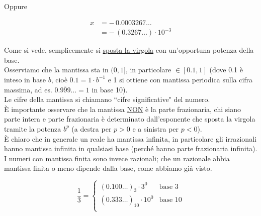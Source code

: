 Oppure
\begin{esempio}
\[\begin{split}
    x & = - \, 0.0003267 \dotsc \\
    & = - \, (0.3267 \dotsc) \cdot 10^{-3} 
\end{split}\]
\end{esempio}
Come si vede, semplicemente si \uline{sposta la virgola} con un'opportuna potenza della base. \\
Osserviamo che la mantissa sta in $(0,1]$, in particolare $\in [0.1, 1]$ (dove 0.1 è inteso in base $b$, cioè $0.1 = 1 \cdot b^{-1}$ e 1 si ottiene con mantissa periodica sulla cifra massima, ad es. $0.\overline{999} \dotsc = 1$ in base 10). \\
Le cifre della mantissa si chiamano ``cifre significative" del numero. \\
È importante osservare che la mantissa \uline{NON} è la parte frazionaria, chi siano parte intera e parte frazionaria è determinato dall'esponente che sposta la virgola tramite la potenza $b^p$ (a destra per $p>0$ e a sinistra per $p<0$). \\
È chiaro che in generale un reale ha mantissa infinita, in particolare gli irrazionali hanno mantissa infinita in qualsiasi base (perché hanno parte frazionaria infinita). \\
I numeri con \uline{mantissa finita} sono invece \uline{razionali}; che un razionale abbia mantissa finita o meno dipende dalla base, come abbiamo già visto.
\begin{esempio} \end{esempio}
\[\frac{1}{3} = 
\begin{cases}
    (0.100 \dotsc)_3 \cdot 3^0 & \text{base 3} \\
    (0.\overline{333} \dotsc)_{10} \cdot 10^0 & \text{base 10} \\
\end{cases}
\]


